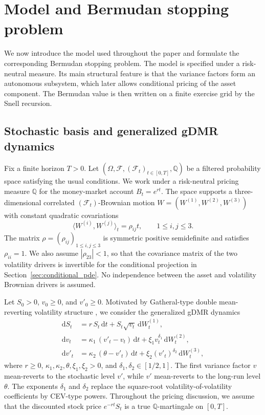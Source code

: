 \documentclass[pdflatex,sn-mathphys-num]{sn-jnl}
\theoremstyle{thmstyleone}%
\theoremstyle{thmstylethree}%
\theoremstyle{thmstyletwo}%
\newcommand{\dd}{\mathrm d}
\newcommand{\Q}{\mathbb Q}
\newcommand{\F}{\mathcal F}
\begin{document}
\section{Model and Bermudan stopping problem}\label{sec:model}

We now introduce the model used throughout the paper and formulate the corresponding Bermudan stopping problem. The model is specified under a risk-neutral measure. Its main structural feature is that the variance factors form an autonomous subsystem, which later allows conditional pricing of the asset component. The Bermudan value is then written on a finite exercise grid by the Snell recursion.

\subsection{Stochastic basis and generalized gDMR dynamics}

Fix a finite horizon $T>0$. Let $(\Omega,\F,(\F_t)_{t\in[0,T]},\Q)$ be a filtered probability space satisfying the usual conditions. We work under a risk-neutral pricing measure $\Q$ for the money-market account $B_t=e^{rt}$. The space supports a three-dimensional correlated $(\F_t)$-Brownian motion $W=(W^{(1)},W^{(2)},W^{(3)})$ with constant quadratic covariations
\[
\langle W^{(i)},W^{(j)}\rangle_t=\rho_{ij}t,\qquad 1\le i,j\le 3.
\]
The matrix $\rho=(\rho_{ij})_{1\le i,j\le 3}$ is symmetric positive semidefinite and satisfies $\rho_{ii}=1$. We also assume $|\rho_{23}|<1$, so that the covariance matrix of the two volatility drivers is invertible for the conditional projection in Section~\ref{sec:conditional_pde}. No independence between the asset and volatility Brownian drivers is assumed.

Let $S_0>0$, $v_0\ge0$, and $v'_0\ge0$. Motivated by Gatheral-type double mean-reverting volatility structure \citep{gatheral2006volsurface,bayer2013fast}, we consider the generalized gDMR dynamics
\begin{equation}\label{eq:gdmr}
\begin{aligned}
\dd S_t &= r\,S_t\,\dd t + S_t\sqrt{v_t}\,\dd W^{(1)}_t,\\
\dd v_t &= \kappa_1\,(v'_t - v_t)\,\dd t + \xi_1 v_t^{\delta_1}\,\dd W^{(2)}_t,\\
\dd v'_t &= \kappa_2\,(\theta - v'_t)\,\dd t + \xi_2 (v'_t)^{\delta_2}\,\dd W^{(3)}_t,
\end{aligned}
\end{equation}
where $r\ge0$, $\kappa_1,\kappa_2,\theta,\xi_1,\xi_2>0$, and $\delta_1,\delta_2\in[1/2,1]$. The first variance factor $v$ mean-reverts to the stochastic level $v'$, while $v'$ mean-reverts to the long-run level $\theta$. The exponents $\delta_1$ and $\delta_2$ replace the square-root volatility-of-volatility coefficients by CEV-type powers. Throughout the pricing discussion, we assume that the discounted stock price $e^{-rt}S_t$ is a true $\Q$-martingale on $[0,T]$.
\end{document}
